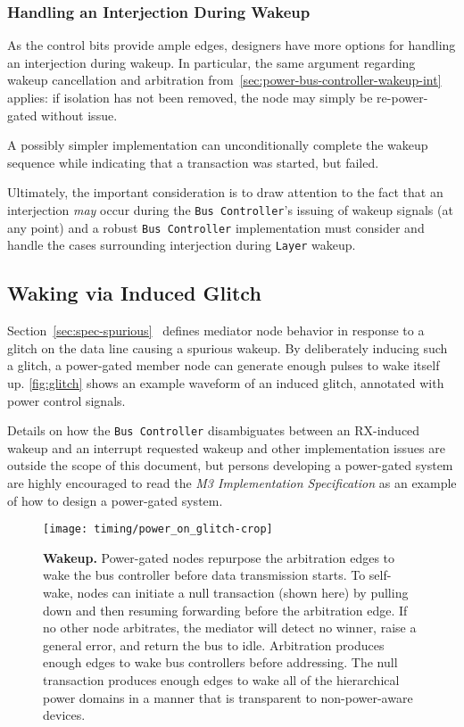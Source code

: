 \subsubsection{Handling an Interjection During Wakeup}
As the control bits provide ample edges, designers have more options for
handling an interjection during wakeup. In particular, the same argument
regarding wakeup cancellation and arbitration
from~\ref{sec:power-bus-controller-wakeup-int} applies: if isolation has not
been removed, the node may simply be re-power-gated without issue.

A possibly simpler implementation can unconditionally complete the wakeup
sequence while indicating that a transaction was started, but failed.

Ultimately, the important consideration is to draw attention to the fact that
an interjection {\em may} occur during the {\tt Bus~Controller}'s issuing of
wakeup signals (at any point) and a robust {\tt Bus~Controller} implementation
must consider and handle the cases surrounding interjection during {\tt Layer}
wakeup.

\subsection{Waking via Induced Glitch}
Section~\ref{sec:spec-spurious}~ defines mediator
node behavior in response to a glitch on the data line causing a spurious
wakeup. By deliberately inducing such a glitch, a power-gated member node can
generate enough pulses to wake itself up. \autoref{fig:glitch} shows an
example waveform of an induced glitch, annotated with power control signals.

Details on how the {\tt Bus~Controller} disambiguates between an RX-induced
wakeup and an interrupt requested wakeup and other implementation issues are
outside the scope of this document, but persons developing a power-gated
system are highly encouraged to read the {\em \bus M3 Implementation
Specification} as an example of how to design a power-gated system.

\begin{figure}
  \centering
  \texttt{[image: timing/power\_on\_glitch-crop]}
  \caption{\textbf{\bus Wakeup.} \textmd{
      Power-gated nodes repurpose the arbitration edges to wake the bus
      controller before data transmission starts. To self-wake, nodes can
      initiate a null transaction (shown here) by pulling down \DAT and then
      resuming forwarding \DAT before the arbitration edge. If no other node
      arbitrates, the mediator will detect no winner, raise a general error,
      and return the bus to idle.
      Arbitration produces enough edges to wake bus controllers before
      addressing. The null transaction produces enough edges to wake all of
      the \bus hierarchical power domains in a manner that is transparent to
      non-power-aware devices.
  }}
  \label{fig:glitch}
\end{figure}

